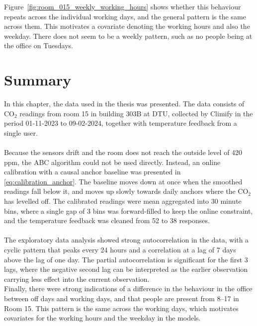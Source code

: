 Figure~\ref{fig:room_015_weekly_working_hours} shows whether this behaviour repeats across the individual working days, and
the general pattern is the same across them. This motivates a covariate denoting the working hours and
also the weekday. There does not seem to be a weekly pattern, such as no people being at the office on Tuesdays.


\section{Summary}
In this chapter, the data used in the thesis was presented. The data consists of $\text{CO}_2$ readings from room 15 in building 303B at DTU,
collected by Climify in the period 01-11-2023 to 09-02-2024, together with temperature feedback from a single user.\\
\\
Because the sensors drift and the room does not reach the outside level of 420 ppm, the ABC algorithm could not be used directly.
Instead, an online calibration with a causal anchor baseline was presented in \cref{eq:calibration_anchor}. The baseline moves down at once
when the smoothed readings fall below it, and moves up slowly towards daily anchors where the $\text{CO}_2$ has levelled off.
The calibrated readings were mean aggregated into 30 minute bins, where a single gap of 3 bins was forward-filled to keep the online constraint,
and the temperature feedback was cleaned from 52 to 38 responses.\\
\\
The exploratory data analysis showed strong autocorrelation in the data, with a cyclic pattern that peaks every 24 hours
and a correlation at a lag of 7 days above the lag of one day. The partial autocorrelation is significant for the first 3 lags,
where the negative second lag can be interpreted as the earlier observation carrying less effect into the current observation. \\
Finally, there were strong indications of a difference in the behaviour in the office between off days and working days,
and that people are present from 8--17 in Room 15. This pattern is the same across the working days, which motivates covariates
for the working hours and the weekday in the models.

